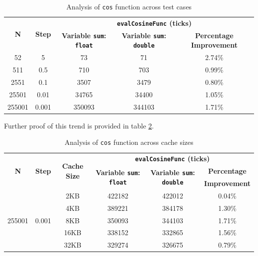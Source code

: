 \documentclass{article}
\begin{document}
\begin{table}[H]
  \centering

    \begin{tabular}{|c|c|c|c|c|}
    \hline
    \multirow{2}[4]{*}{\textbf{N}} & \multirow{2}[4]{*}{\textbf{Step}} & \multicolumn{3}{c|}{\textbf{{\tt evalCosineFunc} (ticks)}} \\
\cline{3-5}          &       & \textbf{Variable {\tt sum}: {\tt float}} & \textbf{Variable {\tt sum}: {\tt double}} & \textbf{Percentage Improvement} \\
    \hline
    52    & 5     & 73    & 71    & 2.74\% \\
    \hline
    511   & 0.5   & 710   & 703   & 0.99\% \\
    \hline
    2551  & 0.1   & 3507  & 3479  & 0.80\% \\
    \hline
    25501 & 0.01  & 34765 & 34400 & 1.05\% \\
    \hline
    255001 & 0.001 & 350093 & 344103 & 1.71\% \\
    \hline
    \end{tabular}
  \caption{Analysis of {\tt cos} function across test cases}
  \label{tab:double_float_task4}%
\end{table}


Further proof of this trend is provided in table \ref{tab:further_proof}. 

\begin{table}[H]
  \centering
    \begin{tabular}{|c|c|c|c|c|c|}
    \hline
    \multirow{3}[4]{*}{\textbf{N}} & \multirow{3}[4]{*}{\textbf{Step}} & \multirow{3}[4]{*}{\textbf{Cache Size}} & \multicolumn{3}{c|}{\textbf{{\tt evalCosineFunc} (ticks)}} \\
\cline{4-6}          &       &       & \multirow{2}[2]{*}{\textbf{Variable {\tt sum}: {\tt float}}} & \multirow{2}[2]{*}{\textbf{Variable {\tt sum}: {\tt double}}} & \textbf{Percentage} \\
          &       &       &       &       & \textbf{Improvement} \\
    \hline
    \multirow{5}{*}{255001} & \multirow{5}{*}{0.001} & 2KB   & 422182 & 422012 & 0.04\% \\
\cline{3-6}          &       & 4KB   & 389221 & 384178 & 1.30\% \\
\cline{3-6}          &       & 8KB   & 350093 & 344103 & 1.71\% \\
\cline{3-6}          &       & 16KB  & 338152 & 332865 & 1.56\% \\
\cline{3-6}          &       & 32KB  & 329274 & 326675 & 0.79\% \\
    \hline
    \end{tabular}%
  \caption{Analysis of {\tt cos} function across cache sizes}
  \label{tab:further_proof}%
\end{table}%
\end{document}
